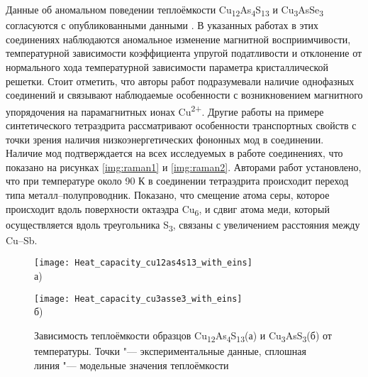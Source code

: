Данные об аномальном поведении теплоёмкости Cu\textsubscript{12}As\textsubscript{4}S\textsubscript{13} и Cu\textsubscript{3}AsSe\textsubscript{3} согласуются с опубликованными данными \cite{bab_1982,bab_81}.
В указанных работах в этих соединениях наблюдаются аномальное изменение магнитной восприимчивости, температурной зависимости коэффициента упругой податливости и отклонение от нормального хода температурной зависимости параметра кристаллической решетки.
Стоит отметить, что авторы работ \cite{bab_1982,bab_81} подразумевали наличие однофазных соединений и связывают наблюдаемые особенности с возникновением магнитного упорядочения на парамагнитных ионах Cu\textsuperscript{2+}.
Другие работы \cite{Lara-Curzio2014,Nasonova2016} на примере синтетического тетраэдрита рассматривают особенности транспортных свойств  с точки зрения наличия низкоэнергетических фононных мод в соединении. Наличие мод подтверждается на всех исследуемых в работе соединениях, что показано на рисунках \ref{img:raman1} и \ref{img:raman2}.
Авторами работ \cite{Lara-Curzio2014,Nasonova2016} установлено, что при температуре около 90 К в соединении тетраэдрита происходит переход типа металл--полупроводник. Показано, что смещение атома серы, которое происходит вдоль поверхности октаэдра Cu\textsubscript{6}, и сдвиг атома меди, который осуществляется вдоль треугольника S\textsubscript{3}, связаны с увеличением расстояния между Cu--Sb.

\begin{figure}[p!]
  \begin{minipage}[ht]{0.9\linewidth}\centering
    \texttt{[image: Heat\_capacity\_cu12as4s13\_with\_eins]} \\ а)
  \end{minipage}
  \vfill
  \begin{minipage}[ht]{0.9\linewidth}\centering
    \texttt{[image: Heat\_capacity\_cu3asse3\_with\_eins]} \\ б)
  \end{minipage}

      \caption[Зависимость теплоёмкости образцов Cu\textsubscript{12}As\textsubscript{4}S\textsubscript{13}(а) и Cu\textsubscript{3}AsS\textsubscript{3}(б) от температуры. Точки "--- экспериментальные данные, сплошная линия "--- модельные значения теплоёмкости]{Зависимость теплоёмкости образцов Cu\textsubscript{12}As\textsubscript{4}S\textsubscript{13}(а) и Cu\textsubscript{3}AsS\textsubscript{3}(б) от температуры. Точки "--- экспериментальные данные, сплошная линия "--- модельные значения теплоёмкости}
    \label{img:heat_en}
\end{figure}


